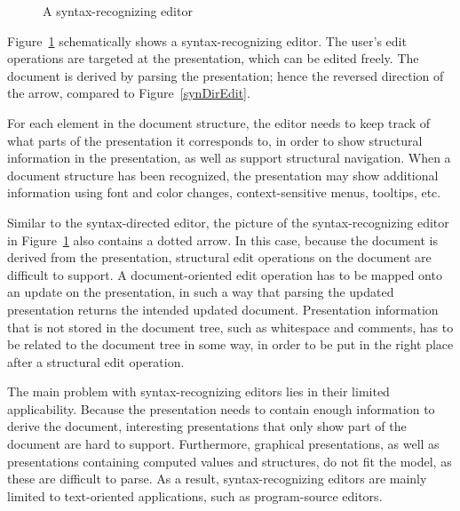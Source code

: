 \begin{figure}
\begin{small}
\begin{center}
\begin{center}
\begin{small}
\noindent
{}
\end{small}
\end{center}\caption{A syntax-recognizing editor}\label{synRecEdit} 
\end{center}
\end{small}
\end{figure}

Figure~\ref{synRecEdit} schematically shows a syntax-recognizing editor. The user's edit operations are targeted at the presentation, which can be edited freely. The document is derived by parsing the presentation; hence the reversed direction of the arrow, compared to Figure~\ref{synDirEdit}.

For each element in the document structure, the editor needs to keep track of what parts of the presentation it corresponds to, in order to show structural information in the presentation, as well as support structural navigation.  When a document structure has been recognized, the presentation may show additional information using font and color changes, context-sensitive menus, tooltips, etc.

Similar to the syntax-directed editor, the picture of the syntax-recognizing editor in Figure~\ref{synRecEdit} also contains a dotted arrow. In this case, because the document is derived from the presentation, structural edit operations on the document are difficult to support. A document-oriented edit operation has to be mapped onto an update on the presentation, in such a way that parsing the updated presentation returns the intended updated document. Presentation information that is not stored in the document tree, such as whitespace and comments, has to be related to the document tree in some way, in order to be put in the right place after a structural edit operation.

The main problem with syntax-recognizing editors lies in their limited applicability. Because the presentation needs to contain enough information to derive the document, interesting presentations that only show part of the document are hard to support. Furthermore, graphical presentations, as well as presentations containing computed values and structures, do not fit the model, as these are difficult to parse. As a result, syntax-recognizing editors are mainly limited to text-oriented applications, such as program-source editors.

